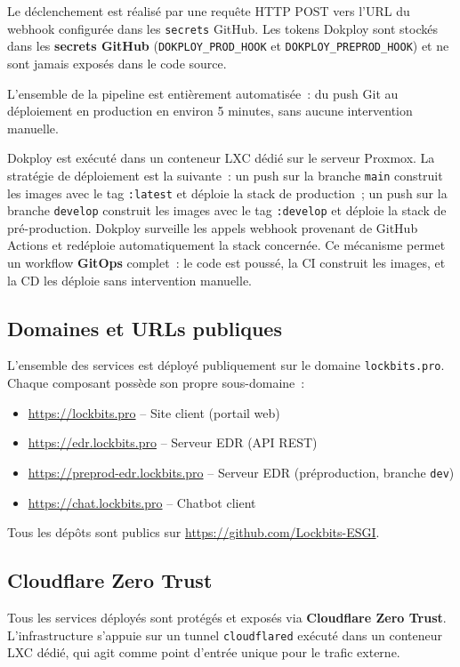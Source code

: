 Le déclenchement est réalisé par une requête HTTP POST vers l'URL du webhook
configurée dans les \texttt{secrets} GitHub. Les tokens Dokploy sont stockés
dans les \textbf{secrets GitHub} (\texttt{DOKPLOY\_PROD\_HOOK} et
\texttt{DOKPLOY\_PREPROD\_HOOK}) et ne sont jamais exposés dans le code source.

L'ensemble de la pipeline est entièrement automatisée~: du push Git au déploiement en production en environ 5 minutes, sans aucune intervention manuelle.

Dokploy est exécuté dans un conteneur LXC dédié sur le serveur Proxmox.
La stratégie de déploiement est la suivante~: un push sur la branche
\texttt{main} construit les images avec le tag \texttt{:latest} et déploie
la stack de production~; un push sur la branche \texttt{develop} construit
les images avec le tag \texttt{:develop} et déploie la stack de
pré-production. Dokploy surveille les appels webhook provenant de GitHub
Actions et redéploie automatiquement la stack concernée. Ce mécanisme
permet un workflow \textbf{GitOps} complet~: le code est poussé, la CI
construit les images, et la CD les déploie sans intervention manuelle.

\subsection{Domaines et URLs publiques}

L'ensemble des services est déployé publiquement sur le domaine
\texttt{lockbits.pro}. Chaque composant possède son propre sous-domaine~:

\begin{itemize}
  \item \url{https://lockbits.pro} -- Site client (portail web)
  \item \url{https://edr.lockbits.pro} -- Serveur EDR (API REST)
  \item \url{https://preprod-edr.lockbits.pro} -- Serveur EDR (préproduction, branche \texttt{dev})
  \item \url{https://chat.lockbits.pro} -- Chatbot client
\end{itemize}

Tous les dépôts sont publics sur \url{https://github.com/Lockbits-ESGI}.

\subsection{Cloudflare Zero Trust}

Tous les services déployés sont protégés et exposés via \textbf{Cloudflare Zero
Trust}. L'infrastructure s'appuie sur un tunnel \texttt{cloudflared} exécuté
dans un conteneur LXC dédié, qui agit comme point d'entrée unique pour le
trafic externe.

